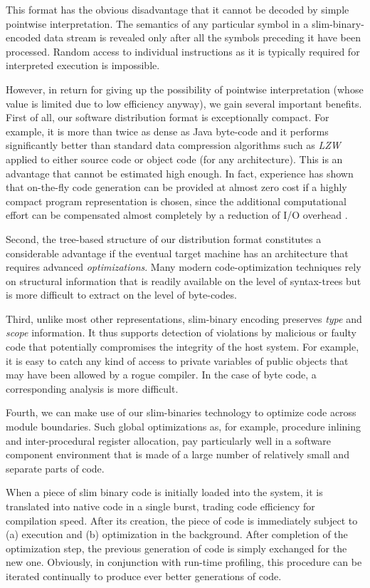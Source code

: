 \ein
This format has the obvious disadvantage that it cannot be decoded by simple
pointwise interpretation. The semantics of any particular symbol in a
slim-binary-encoded data stream is revealed
only after all the symbols preceding it have been processed. Random
access to individual instructions as it is typically required for interpreted
execution is impossible.

\ein
However, in return for giving up the possibility of pointwise interpretation
(whose value is limited due to low efficiency anyway), we gain several
important benefits. First of all, our software distribution format is
exceptionally compact. For example, it is more than twice as dense
as Java byte-code and it performs significantly better than standard data
compression algorithms such as {\em LZW\/} applied to either source code
or object code (for any architecture). This is an advantage that cannot be
estimated high enough. In fact, experience has shown that on-the-fly code
generation can be provided at almost zero cost if a highly compact program
representation is chosen, since the additional computational effort can be
compensated almost completely by a reduction of I/O overhead \cite{F3}.

\ein
Second, the tree-based structure of our distribution format constitutes a
considerable advantage if the eventual target machine has an architecture
that requires advanced {\em optimizations}. Many modern code-optimization
techniques rely on structural information that is readily available on the
level of syntax-trees but is more difficult to extract on the level of
byte-codes.

\ein
Third, unlike most other representations, slim-binary encoding preserves
{\em type\/} and {\em scope\/} information. It thus supports detection
of violations by malicious or faulty code that potentially compromises the
integrity of the host system. For example, it is easy to catch any kind of
access to private variables of public objects that may have been allowed
by a rogue compiler. In the case of byte code, a corresponding analysis
is more difficult.

\ein
Fourth, we can make use of our slim-binaries technology to optimize code
across module boundaries. Such global optimizations as, for example,
procedure inlining and inter-procedural register allocation, pay particularly
well in a software component environment that is made of a large number
of relatively small and separate parts of code.

When a piece of slim binary code is initially loaded into the system,
it is translated into native code in a single burst, trading code efficiency
for
compilation speed. After its creation, the piece of code is immediately
subject
to (a) execution and (b) optimization in the background. After completion
of the optimization step, the previous generation of code is simply exchanged
for the new one. Obviously, in conjunction with run-time profiling,
this procedure can be iterated continually to produce ever better
generations of code.

